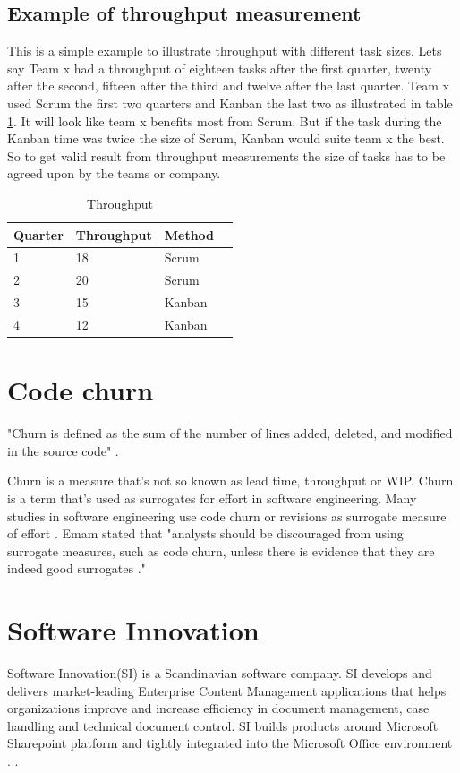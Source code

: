 \documentclass[UKenglish]{ifimaster}  %
\begin{document}
\subsection{Example of throughput measurement}
\label{sub:sub:throughput}
This is a simple example to illustrate throughput with different task sizes. Lets say Team x had a throughput of eighteen tasks after the first quarter, twenty after the second, fifteen after the third and twelve after the last quarter. Team x used Scrum the first two quarters and Kanban the last two as illustrated in table \ref{tt}. It will look like team x benefits most from Scrum. But if the task during the Kanban time was twice the size of Scrum, Kanban would suite team x the best. So to get valid result from throughput measurements the size of tasks has to be agreed upon by the teams or company.
\begin{table}[ht]
\begin{center}
    \begin{tabular}{| l | l | l | l |}
    \hline
    Quarter & Throughput & Method\\ \hline
    1 & 18 & Scrum\\ \hline
    2 & 20 & Scrum \\ \hline
    3 & 15 & Kanban\\ \hline
    4 & 12 & Kanban\\ \hline
    \end{tabular}
\caption{Throughput}
\label{tt} %
\end{center}
\end{table}

\section{Code churn}
\label{sec:Churn}
"Churn is defined as the sum of the number of lines added, deleted, and modified in the source code" \parencite{Dag}.

Churn is a measure that's not so known as lead time, throughput or WIP. Churn is a term that's used as surrogates for effort in software engineering. Many studies in software engineering use code churn or revisions as surrogate measure of effort \parencite{yamashita2012quantifying}. Emam stated that "analysts should be discouraged from using surrogate measures, such as code churn, unless there is evidence that they are indeed good surrogates \parencite{el2000methodology}."  


\section{Software Innovation}
\label{sec:SI}
Software Innovation(SI) is a Scandinavian software company. SI develops and delivers market-leading Enterprise Content Management applications that helps organizations improve and increase efficiency in document management, case handling and technical document control. SI builds products around Microsoft Sharepoint platform and tightly integrated into the Microsoft Office environment \parencite{Dag}. \parencite{SI}.
\end{document}
